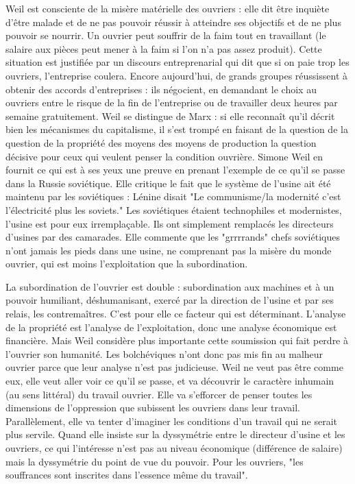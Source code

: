 \documentclass[a4paper,12pt]{book}
\begin{document}
\par Weil est consciente de la misère matérielle des ouvriers : elle dit être inquiète d'être malade et de ne pas pouvoir réussir à atteindre ses objectifs et de ne plus pouvoir se nourrir. Un ouvrier peut souffrir de la faim tout en travaillant (le salaire aux pièces peut mener à la faim si l'on n'a pas assez produit). Cette situation est justifiée par un discours entreprenarial qui dit que si on paie trop les ouvriers, l'entreprise coulera. Encore aujourd'hui, de grands groupes réussissent à obtenir des accords d'entreprises : ils négocient, en demandant le choix au ouvriers entre le risque de la fin de l'entreprise ou de travailler deux heures par semaine gratuitement. Weil se distingue de Marx : si elle reconnaît qu'il décrit bien les mécanismes du capitalisme, il s'est trompé en faisant de la question de la question de la propriété des moyens des moyens de production la question décisive pour ceux qui veulent penser la condition ouvrière. Simone Weil en fournit ce qui est à ses yeux une preuve en prenant l'exemple de ce qu'il se passe dans la Russie soviétique. Elle critique le fait que le système de l'usine ait été maintenu par les soviétiques : Lénine disait "Le communisme/la modernité c'est l'électricité plus les soviets." Les soviétiques étaient technophiles et modernistes, l'usine est pour eux irremplaçable. Ils ont simplement remplacés les directeurs d'usines par des camarades. Elle commente que les "grrrrands" chefs soviétiques n'ont jamais les pieds dans une usine, ne comprenant pas la misère du monde ouvrier, qui est moins l'exploitation que la subordination.
\par La subordination de l'ouvrier est double : subordination aux machines et à un pouvoir humiliant, déshumanisant, exercé par la direction de l'usine et par ses relais, les contremaîtres. C'est pour elle ce facteur qui est déterminant. L'analyse de la propriété est l'analyse de l'exploitation, donc une analyse économique est financière. Mais Weil considère plus importante cette soumission qui fait perdre à l'ouvrier son humanité. Les bolchéviques n'ont donc pas mis fin au malheur ouvrier parce que leur analyse n'est pas judicieuse. Weil ne veut pas être comme eux, elle veut aller voir ce qu'il se passe, et va découvrir le caractère inhumain (au sens littéral) du travail ouvrier. Elle va s'efforcer de penser toutes les dimensions de l'oppression que subissent les ouvriers dans leur travail. Parallèlement, elle va tenter d'imaginer les conditions d'un travail qui ne serait plus servile. Quand elle insiste sur la dyssymétrie entre le directeur d'usine et les ouvriers, ce qui l'intéresse n'est pas au niveau économique (différence de salaire) mais la dyssymétrie du point de vue du pouvoir. Pour les ouvriers, "les souffrances sont inscrites dans l'essence même du travail".
\end{document}
